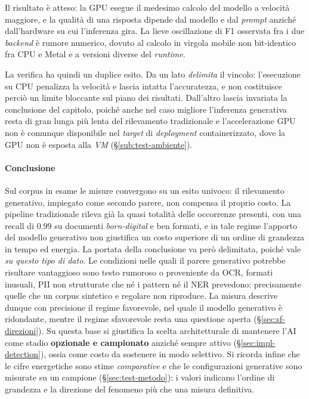 Il risultato è atteso: la GPU esegue il medesimo calcolo del modello a velocità maggiore, e la qualità di una risposta dipende dal modello e dal \textit{prompt} anziché dall'hardware su cui l'inferenza gira. La lieve oscillazione di F1 osservata fra i due \textit{backend} è rumore numerico, dovuto al calcolo in virgola mobile non bit-identico fra CPU e Metal e a versioni diverse del \textit{runtime}.

La verifica ha quindi un duplice esito. Da un lato \emph{delimita} il vincolo: l'esecuzione su CPU penalizza la velocità e lascia intatta l'accuratezza, e non costituisce perciò un limite bloccante sul piano dei risultati. Dall'altro lascia invariata la conclusione del capitolo, poiché anche nel caso migliore l'inferenza generativa resta di gran lunga più lenta del rilevamento tradizionale e l'accelerazione GPU non è comunque disponibile nel \textit{target} di \textit{deployment} containerizzato, dove la GPU non è esposta alla \textit{VM} (§\ref{sub:test-ambiente}).


\paragraph*{Conclusione} Sul corpus in esame le misure convergono su un esito univoco: il rilevamento generativo, impiegato come secondo parere, non compensa il proprio costo. La pipeline tradizionale rileva già la quasi totalità delle occorrenze presenti, con una recall di $0.99$ su documenti \emph{born-digital} e ben formati, e in tale regime l'apporto del modello generativo non giustifica un costo superiore di un ordine di grandezza in tempo ed energia. La portata della conclusione va però delimitata, poiché vale \emph{su questo tipo di dato}. Le condizioni nelle quali il parere generativo potrebbe risultare vantaggioso sono testo rumoroso o proveniente da OCR, formati inusuali, PII non strutturate che né i pattern né il NER prevedono: precisamente quelle che un corpus sintetico e regolare non riproduce. La misura descrive dunque con precisione il regime favorevole, nel quale il modello generativo è ridondante, mentre il regime sfavorevole resta una questione aperta (§\ref{sec:sf-direzioni}). Su questa base si giustifica la scelta architetturale di mantenere l'AI come stadio \textbf{opzionale e campionato} anziché sempre attivo (§\ref{sec:impl-detection}), ossia come costo da sostenere in modo selettivo. Si ricorda infine che le cifre energetiche sono stime \emph{comparative} e che le configurazioni generative sono misurate su un campione (§\ref{sec:test-metodo}): i valori indicano l'ordine di grandezza e la direzione del fenomeno più che una misura definitiva.
